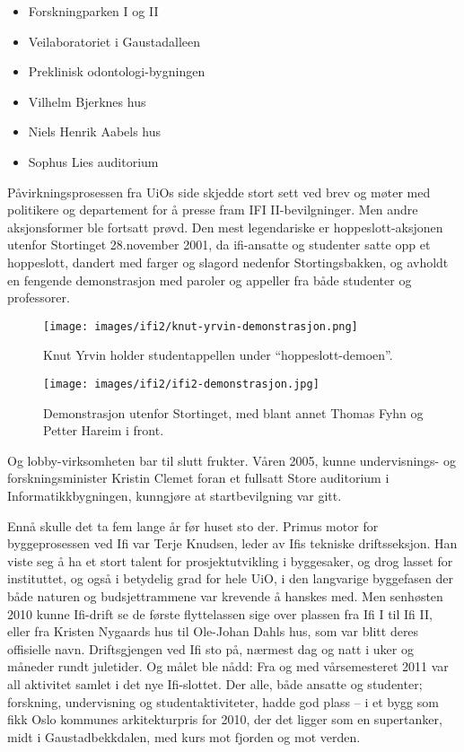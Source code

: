 \begin{itemize}
	\item Forskningparken I og II
	\item Veilaboratoriet i Gaustadalleen
	\item Preklinisk odontologi-bygningen
	\item Vilhelm Bjerknes hus
	\item Niels Henrik Aabels hus
	\item Sophus Lies auditorium
\end{itemize}

Påvirkningsprosessen fra UiOs side skjedde stort sett ved brev og møter med politikere og departement for å presse fram IFI II-bevilgninger. Men andre aksjonsformer ble fortsatt prøvd. Den mest legendariske er hoppeslott-aksjonen utenfor Stortinget 28.november 2001, da ifi-ansatte og studenter satte opp et hoppeslott, dandert med farger og slagord nedenfor Stortingsbakken, og avholdt en fengende demonstrasjon med paroler og appeller fra både studenter og professorer.

\begin{figure}
	\texttt{[image: images/ifi2/knut-yrvin-demonstrasjon.png]}
	\caption{Knut Yrvin holder studentappellen under ``hoppeslott-demoen''.}
\end{figure}

\begin{figure}
	\texttt{[image: images/ifi2/ifi2-demonstrasjon.jpg]}
	\caption{Demonstrasjon utenfor Stortinget, med blant annet Thomas Fyhn og Petter Hareim i front.}
\end{figure}

Og lobby-virksomheten bar til slutt frukter. Våren 2005, kunne undervisnings- og forskningsminister Kristin Clemet foran et fullsatt Store auditorium i Informatikkbygningen, kunngjøre at startbevilgning var gitt.

Ennå skulle det ta fem lange år før huset sto der. Primus motor for byggeprosessen ved Ifi var Terje Knudsen, leder av Ifis tekniske driftsseksjon. Han viste seg å ha et stort talent for prosjektutvikling i byggesaker, og drog lasset for instituttet, og også i betydelig grad for hele UiO, i den langvarige
byggefasen der både naturen og budsjettrammene var krevende å hanskes med. Men senhøsten 2010 kunne Ifi-drift se de første flyttelassen sige over plassen fra Ifi I til Ifi II, eller fra Kristen Nygaards hus til Ole-Johan Dahls hus, som var blitt deres offisielle navn. Driftsgjengen ved Ifi sto på,
nærmest dag og natt i uker og måneder rundt juletider. Og målet ble nådd: Fra og med vårsemesteret 2011 var all aktivitet samlet i det nye Ifi-slottet. Der alle, både ansatte og studenter; forskning, undervisning og studentaktiviteter, hadde god plass – i et bygg som fikk Oslo kommunes arkitekturpris for 2010, der det ligger som en supertanker, midt i Gaustadbekkdalen, med kurs mot fjorden og mot verden.

